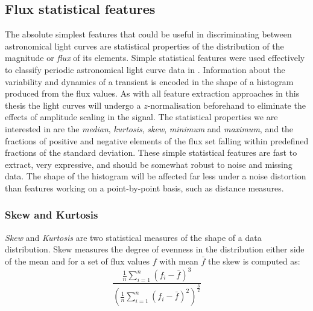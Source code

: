 	

	

	\subsection{Flux statistical features}
	The absolute simplest features that could be useful in discriminating between astronomical light curves are statistical properties of the distribution of the magnitude or \emph{flux} of its elements. Simple statistical features were used effectively to classify periodic astronomical light curve data in \citet{richards2011machine}. Information about the variability and dynamics of a transient is encoded in the shape of a histogram produced from the flux values. As with all feature extraction approaches in this thesis the light curves will undergo a $z$-normalisation beforehand to eliminate the effects of amplitude scaling in the signal. The statistical properties we are interested in are the \emph{median}, \emph{kurtosis}, \emph{skew}, \emph{minimum} and \emph{maximum}, and the fractions of positive and negative elements of the flux set falling within predefined fractions of the standard deviation. These simple statistical features are fast to extract, very expressive, and should be somewhat robust to noise and missing data. The shape of the histogram will be affected far less under a noise distortion than features working on a point-by-point basis, such as distance measures. %
	
	\subsubsection{Skew and Kurtosis}
	\emph{Skew} and \emph{Kurtosis} are two statistical measures of the shape of a data distribution. Skew measures the degree of evenness in the distribution either side of the mean and for a set of flux values $f$ with mean $\bar{f}$ the skew is computed as:
	\begin{equation}
		\frac{\frac{1}{n}\sum\limits^{n}_{i=1}(f_{i} - \bar{f})^{3}}
		{(\frac{1}{n}\sum\limits^{n}_{i=1}(f_{i} - \bar{f})^{2})^{\frac{3}{2}}}
	\end{equation}
	
